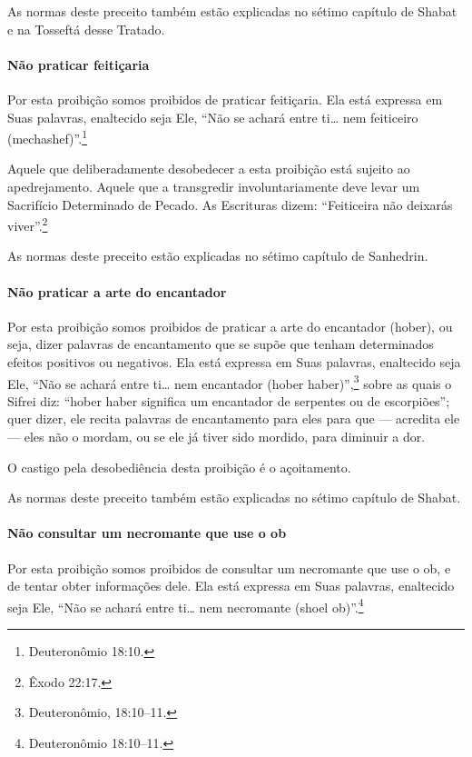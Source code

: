 \begin{multicols}{2}
As normas deste preceito também estão explicadas no sétimo capítulo de
Shabat e na Tosseftá\starr{} desse Tratado.

\paragraph{Não praticar feitiçaria}

Por esta proibição somos proibidos de praticar feitiçaria. Ela está
expressa em Suas palavras, enaltecido seja Ele, ``Não se achará entre
ti\ldots{} nem feiticeiro (mechashef\starr)''.\footnote{Deuteronômio 18:10.}

Aquele que deliberadamente desobedecer a esta proibição está sujeito ao
apedrejamento. Aquele que a transgredir involuntariamente deve levar um
Sacrifício Determinado de Pecado. As Escrituras dizem: ``Feiticeira não
deixarás viver''.\footnote{Êxodo 22:17.}

As normas deste preceito estão explicadas no sétimo capítulo de Sanhedrin\starr.

\paragraph{Não praticar a arte do encantador}

Por esta proibição somos proibidos de praticar a arte do encantador
(hober\starr), ou seja, dizer palavras de encantamento que se supõe que
tenham determinados efeitos positivos ou negativos. Ela está expressa em
Suas palavras, enaltecido seja Ele, ``Não se achará entre ti\ldots{} nem
encantador (hober haber\starr)'',\footnote{Deuteronômio, 18:10--11.} sobre as quais o
Sifrei\starr{} diz: ``hober haber\starr{} significa um encantador de serpentes ou de
escorpiões''; quer dizer, ele recita palavras de encantamento para eles
para que --- acredita ele --- eles não o mordam, ou se ele já tiver sido
mordido, para diminuir a dor.

O castigo pela desobediência desta proibição é o açoitamento.

As normas deste preceito também estão explicadas no sétimo capítulo de
Shabat.

\paragraph{Não consultar um necromante que use o ob\starr}

Por esta proibição somos proibidos de consultar um necromante que use o
ob\starr, e de tentar obter informações dele. Ela está expressa em Suas
palavras, enaltecido seja Ele, ``Não se achará entre ti\ldots{} nem
necromante (shoel ob\starr)''.\footnote{Deuteronômio 18:10--11.}


\end{multicols}
